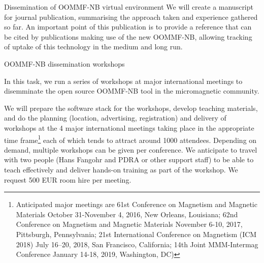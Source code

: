 \begin{Workpackage}{\thewpno}
\begin{task}{Dissemination of OOMMF-NB virtual environment}
  We will create a manuscript for journal publication, summarising the
  approach taken and experience gathered so far. An important point of
  this publication is to provide a reference that can be cited by
  publications making use of the new OOMMF-NB, allowing tracking of
  uptake of this technology in the medium and long run.
\end{task}

\begin{WPDeliverables}

\end{WPDeliverables}




\begin{task}{OOMMF-NB dissemination workshops}
  \label{task:dissemination-of-oommf-nb-workshops}
  
  In this task, we run a series of workshops at major international
  meetings to disemminate the open source OOMMF-NB tool in the
  micromagnetic community.

  We will prepare the software stack for the workshops, develop teaching
  materials, and do the planning (location, advertising, registration)
  and delivery of workshops at the 4 major international meetings
  taking place in the appropriate time frame\footnote{Anticipated
    major meetings are 61st Conference
    on Magnetism and Magnetic Materials October 31-November 4, 2016,
    New Orleans, Louisiana; 62nd Conference on Magnetism and Magnetic
    Materials November 6-10, 2017, Pittsburgh, Pennsylvania; 21st
    International Conference on Magnetism (ICM 2018) July 16–20, 2018,
    San Francisco, California; 14th Joint MMM-Intermag Conference
    January 14-18, 2019, Washington, DC)} each of which tends to
  attract around 1000 attendees. Depending on demand, multiple
  workshops can be given per conference. We anticipate to travel with two
  people (Hans Fangohr and PDRA or other support staff) to be able to teach
  effectively and deliver hands-on training as part of the
  workshop. We request 500 EUR room hire per meeting.
\end{task}


\end{Workpackage}
